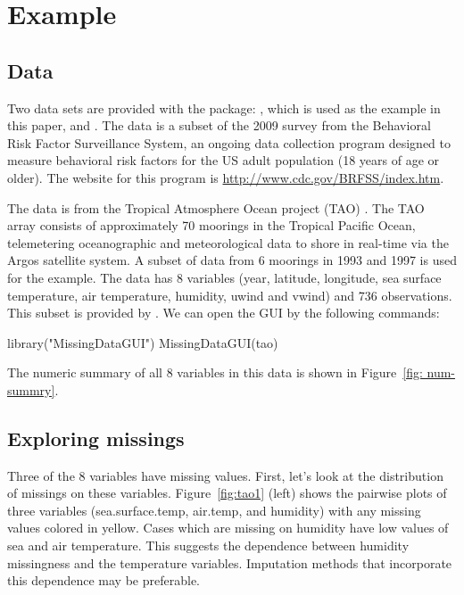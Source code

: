 \documentclass[article]{jss}
\begin{document}
\section{Example}\label{Examples}

\subsection{Data}

Two data sets are provided with the package: , which is used as the example in this paper, and . The  data is a subset of the 2009 survey from the Behavioral Risk Factor Surveillance System, an ongoing data collection program designed to measure behavioral risk factors for the US adult population (18 years of age or older). The website for this program is \url{http://www.cdc.gov/BRFSS/index.htm}.

The data  is from the Tropical Atmosphere Ocean project (TAO) \citep{tao}. The TAO array consists of approximately 70 moorings in the Tropical Pacific Ocean, telemetering oceanographic and meteorological data to shore in real-time via the Argos satellite system. A subset of data from 6 moorings in 1993 and 1997 is used for the example. The data has 8 variables (year, latitude, longitude, sea surface temperature, air temperature, humidity, uwind and vwind) and 736 observations. This subset is provided by \citet{CS07}. We can open the GUI by the following commands:

\begin{Code}
library("MissingDataGUI")
MissingDataGUI(tao)
\end{Code}

The numeric summary of all 8 variables in this data is shown in Figure~\ref{fig: num-summry}.



\subsection{Exploring missings}

Three of the 8 variables have missing values. First, let's look at the distribution of missings on these variables. Figure~\ref{fig:tao1} (left) shows the pairwise plots of three variables (sea.surface.temp, air.temp, and humidity) with any missing values colored in yellow. Cases which are missing on humidity have low values of sea and air temperature. This suggests the dependence between humidity missingness and the temperature variables. Imputation methods that incorporate this dependence may be preferable.
\end{document}
